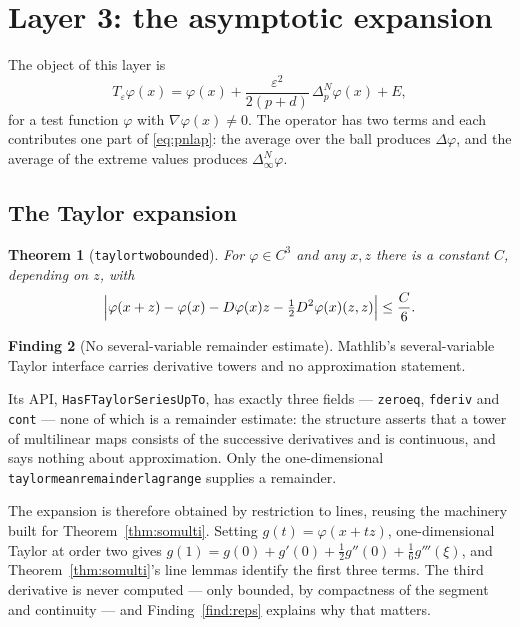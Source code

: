 \documentclass[11pt,reqno]{amsart}
\newcommand{\LEANREF}[1]{\texttt{\small\def\_{\textunderscore\allowbreak}#1}}
\newcommand{\eps}{\varepsilon}
\newcommand{\dlap}{\Delta}
\newcommand{\pnlap}{\Delta_p^{N}}
\newcommand{\inflap}{\Delta_\infty^{N}}
\newcommand{\Op}{T_\eps}
\theoremstyle{plain}
\newtheorem{theorem}{Theorem}[section]
\theoremstyle{definition}
\newtheorem{finding}[theorem]{Finding}
\begin{document}
\section{Layer 3: the asymptotic expansion}\label{sec:layer3}

The object of this layer is
\begin{equation}\label{eq:target}
  \Op\varphi(x) = \varphi(x)
    + \frac{\eps^2}{2(p+d)}\,\pnlap\varphi(x) + E ,
\end{equation}
for a test function $\varphi$ with $\nabla\varphi(x) \ne 0$. The operator has
two terms and each contributes one part of \eqref{eq:pnlap}: the average over
the ball produces $\dlap\varphi$, and the average of the extreme values
produces $\inflap\varphi$.

\subsection{The Taylor expansion}

\begin{theorem}[\LEANREF{taylor\_two\_bounded}]\label{thm:taylor}
For $\varphi \in C^3$ and any $x, z$ there is a constant $C$, depending on $z$,
with
\[
  \Bigl\lvert \varphi(x+z) - \varphi(x) - D\varphi(x)z
    - \tfrac12 D^2\varphi(x)(z,z) \Bigr\rvert \le \frac{C}{6} .
\]
\end{theorem}

\begin{finding}[No several-variable remainder estimate]\label{find:jets}
Mathlib's several-variable Taylor interface carries derivative towers and no
approximation statement.
\end{finding}

Its API, \LEANREF{HasFTaylorSeriesUpTo}, has exactly three fields ---
\LEANREF{zero\_eq}, \LEANREF{fderiv} and \LEANREF{cont} --- none of which is a
remainder estimate:
the structure asserts that a tower of multilinear maps consists of the
successive derivatives and is continuous, and says nothing about
approximation. Only the one-dimensional
\LEANREF{taylor\_mean\_remainder\_lagrange} supplies a remainder.

The expansion is therefore obtained by restriction to lines, reusing the
machinery built for Theorem~\ref{thm:somulti}. Setting $g(t) =
\varphi(x+tz)$, one-dimensional Taylor at order two gives
$g(1) = g(0) + g'(0) + \tfrac12 g''(0) + \tfrac16 g'''(\xi)$, and
Theorem~\ref{thm:somulti}'s line lemmas identify the first three terms. The
third derivative is never computed --- only bounded, by compactness of the
segment and continuity --- and Finding~\ref{find:reps} explains why that
matters.
\end{document}
